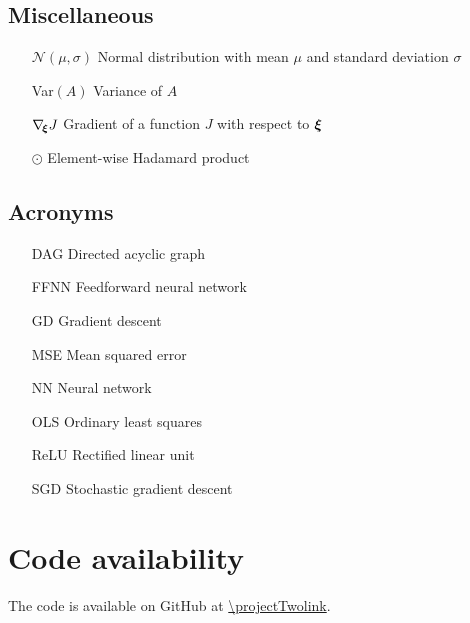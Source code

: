 \subsection*{Miscellaneous}
\begin{enumerate}[leftmargin=4.1em]
    \item[$\mathcal{N}(\mu, \sigma)$]  Normal distribution with mean $\mu$ and standard deviation $\sigma$
    \item[Var$(A)$] Variance of $A$ %
    \item[$\nabla_{\!\boldsymbol{\xi}} J$] Gradient of a function $J$ with respect to $\boldsymbol{\xi}$
    \item[$\odot$] Element-wise Hadamard product 
\end{enumerate}

\subsection*{Acronyms}
\begin{enumerate}[leftmargin=3.3em]
    \item[DAG] Directed acyclic graph
    \item[FFNN] Feedforward neural network
    \item[GD] Gradient descent
    \item[MSE] Mean squared error 
    \item[NN] Neural network 
    \item[OLS] Ordinary least squares 
    \item[ReLU] Rectified linear unit
    \item[SGD] Stochastic gradient descent 
\end{enumerate}








\section*{Code availability}
The code is available on GitHub at \url{\projectTwolink}.







